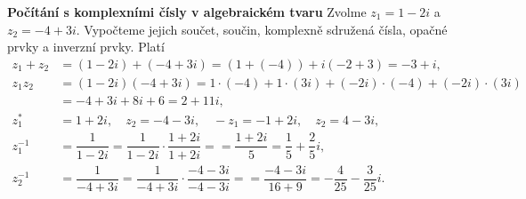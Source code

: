 \wikitextrule
\begin{example}\label{mai:exam078}
  \textbf{Počítání s komplexními čísly v algebraickém tvaru}\newline\small
    Zvolme \(z_1 = 1-2i\) a \(z_2 =-4+3i\). Vypočteme jejich součet, součin, komplexně sdružená 
    čísla, opačné prvky a inverzní prvky. Platí
    \begin{align*}
      z_1 + z_2 &= (1-2i) +(-4+3i) = (1 + (-4)) + i(-2+3) = -3 + i,                           \\
      z_1z_2    &= (1-2i)(-4+3i) = 1\cdot(-4) +1\cdot(3i) + (-2i)\cdot(-4) + (-2i)\cdot(3i)   \\
                &= -4 + 3i + 8i + 6 = 2 + 11i,                                                \\
      z_1^*     &= 1+2i, \quad z_2 =-4-3i, \quad -z_1 = -1+2i, \quad z_2 =4-3i,               \\
      z_1^{-1}  &= \dfrac{1}{1-2i} = \dfrac{1}{1-2i}\cdot \dfrac{1+2i}{1+2i} = 
                 = \dfrac{1+2i}{5} = \dfrac{1}{5} + \dfrac{2}{5}i,                            \\
      z_2^{-1}  &= \dfrac{1}{-4+3i} = \dfrac{1}{-4+3i}\cdot\dfrac{-4-3i}{-4-3i} = 
                 = \dfrac{-4-3i}{16+9} = -\dfrac{4}{25} - \dfrac{3}{25}i.
    \end{align*}
  \normalsize
\end{example}